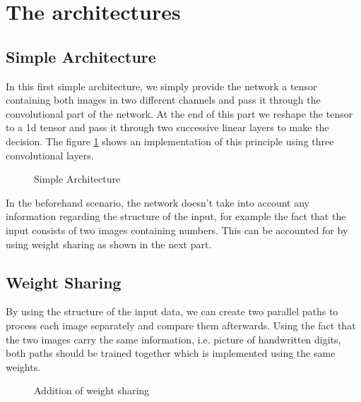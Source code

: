 \documentclass{article}
\begin{document}
\thispagestyle{fancy}

\section{The architectures}

\subsection{Simple Architecture}

In this first simple architecture, we simply provide the network a tensor containing both images in two different channels and pass it through the convolutional part of the network. At the end of this part we reshape the tensor to a 1d tensor and pass it through two successive linear layers to make the decision. The figure \ref{fig:simple} shows an implementation of this principle using three convolutional layers. 

\begin{figure}[H]
\caption{Simple Architecture}
\label{fig:simple}
\end{figure}

In the beforehand scenario, the network doesn't take into account any information regarding the structure of the input, for example the fact that the input consists of two images containing numbers. This can be accounted for by using weight sharing as shown in the next part.

\subsection{Weight Sharing}

By using the structure of the input data, we can create two parallel paths to process each image separately and compare them afterwards. Using the fact that the two images carry the same information, i.e. picture of handwritten digits, both paths should be trained together which is implemented using the same weights. %

\begin{figure}[H]
\caption{Addition of weight sharing}
\end{figure}
\end{document}
